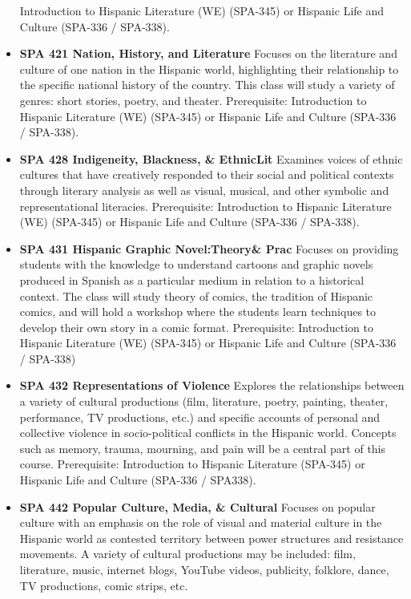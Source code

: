 \documentclass[
  letterpaper,
]{scrbook}
\begin{document}
\begin{itemize}
  Introduction to Hispanic Literature (WE) (SPA-345) or Hispanic Life
  and Culture (SPA-336 / SPA-338).
\item
  \textbf{SPA 421 Nation, History, and Literature} Focuses on the
  literature and culture of one nation in the Hispanic world,
  highlighting their relationship to the specific national history of
  the country. This class will study a variety of genres: short stories,
  poetry, and theater. Prerequisite: Introduction to Hispanic Literature
  (WE) (SPA-345) or Hispanic Life and Culture (SPA-336 / SPA-338).
\item
  \textbf{SPA 428 Indigeneity, Blackness, \& EthnicLit} Examines voices
  of ethnic cultures that have creatively responded to their social and
  political contexts through literary analysis as well as visual,
  musical, and other symbolic and representational literacies.
  Prerequisite: Introduction to Hispanic Literature (WE) (SPA-345) or
  Hispanic Life and Culture (SPA-336 / SPA-338).
\item
  \textbf{SPA 431 Hispanic Graphic Novel:Theory\& Prac} Focuses on
  providing students with the knowledge to understand cartoons and
  graphic novels produced in Spanish as a particular medium in relation
  to a historical context. The class will study theory of comics, the
  tradition of Hispanic comics, and will hold a workshop where the
  students learn techniques to develop their own story in a comic
  format. Prerequisite: Introduction to Hispanic Literature (WE)
  (SPA-345) or Hispanic Life and Culture (SPA-336 / SPA-338)
\item
  \textbf{SPA 432 Representations of Violence} Explores the
  relationships between a variety of cultural productions (film,
  literature, poetry, painting, theater, performance, TV productions,
  etc.) and specific accounts of personal and collective violence in
  socio-political conflicts in the Hispanic world. Concepts such as
  memory, trauma, mourning, and pain will be a central part of this
  course. Prerequisite: Introduction to Hispanic Literature (SPA-345) or
  Hispanic Life and Culture (SPA-336 / SPA338).
\item
  \textbf{SPA 442 Popular Culture, Media, \& Cultural} Focuses on
  popular culture with an emphasis on the role of visual and material
  culture in the Hispanic world as contested territory between power
  structures and resistance movements. A variety of cultural productions
  may be included: film, literature, music, internet blogs, YouTube
  videos, publicity, folklore, dance, TV productions, comic strips, etc.

\end{itemize}
\end{document}
